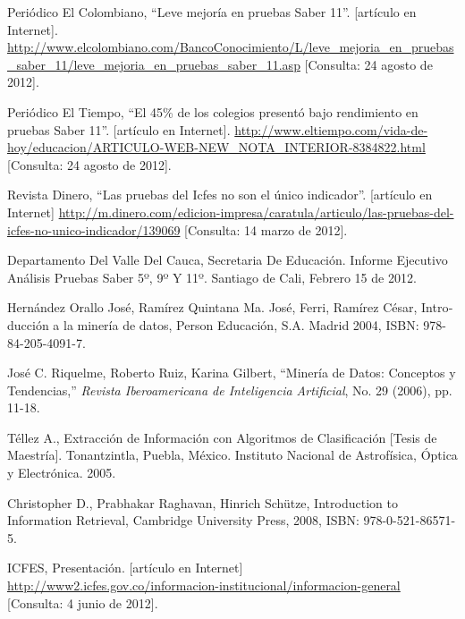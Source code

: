 \begin{thebibliography}{Referencias}
\foreignlanguage{english}{Periódico
El Colombiano, \textquotedblleft{}Leve mejoría en pruebas Saber 11\textquotedblright{}.
{[}artículo en Internet{]}}. \url{http://www.elcolombiano.com/BancoConocimiento/L/leve_mejoria_en_pruebas_saber_11/leve_mejoria_en_pruebas_saber_11.asp}\foreignlanguage{english}{
{[}Consulta: 24 agosto de 2012{]}.}

Periódico El Tiempo, \textquotedblleft{}El 45\% de
los colegios presentó bajo rendimiento en pruebas Saber 11\textquotedblright{}.
{[}artículo en Internet{]}\foreignlanguage{spanish}{. }\url{http://www.eltiempo.com/vida-de-hoy/educacion/ARTICULO-WEB-NEW\_NOTA\_INTERIOR-8384822.html}\foreignlanguage{spanish}{
}{[}Consulta: 24 agosto de 2012{]}.

Revista Dinero, \textquotedblleft{}Las pruebas del
Icfes no son el único indicador\textquotedblright{}. {[}artículo en
Internet{]}   \url{http://m.dinero.com/edicion-impresa/caratula/articulo/las-pruebas-del-icfes-no-unico-indicador/139069}
{[}Consulta: 14 marzo de 2012{]}.

Departamento Del Valle Del Cauca, Secretaria De Educación.
Informe Ejecutivo Análisis Pruebas Saber 5º, 9º Y 11º. Santiago de
Cali, Febrero 15 de 2012.

\foreignlanguage{spanish}{Hernández Orallo José,
Ramírez Quintana Ma. José, Ferri, Ramírez César, Introducción a la
minería de datos, Person Educación, S.A. Madrid 2004, ISBN: 978-84-205-4091-7.}

%
José C. Riquelme, Roberto Ruiz, Karina Gilbert, \textquotedblleft{}Minería
de Datos: Conceptos y Tendencias,\textquotedblright{} \emph{Revista
Iberoamericana de Inteligencia Artificial}, No. 29 (2006), pp. 11-18.

Téllez A., Extracción de Información con Algoritmos
de Clasificación {[}Tesis de Maestría{]}. Tonantzintla, Puebla, México.
Instituto Nacional de Astrofísica, Óptica y Electrónica. 2005.

Christopher D., Prabhakar Raghavan, Hinrich Schütze, Introduction to Information Retrieval, Cambridge University Press, 2008, ISBN: 978-0-521-86571-5.

ICFES, Presentación. {[}artículo en Internet{]} \url{http://www2.icfes.gov.co/informacion-institucional/informacion-general}
{[}Consulta: 4 junio de 2012{]}.


\end{thebibliography}
